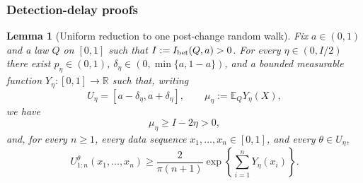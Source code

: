 \documentclass[12pt]{article}
\theoremstyle{spaced}
\newtheorem{lemma}[lemma]{Lemma}
\theoremstyle{remark}
\newcommand{\E}{\mathbb E}
\begin{document}
\subsubsection{Detection-delay proofs}
\label{app:bounded-UP-delay}


\begin{lemma}[Uniform reduction to one post-change random walk]
\label{lem:UP-one-good-bet-uniform}
Fix $a\in(0,1)$ and a law $Q$ on $[0,1]$ such that
$I:=I_{\rm bet}(Q,a)>0$.  For every $\eta\in(0,I/2)$ there exist
$p_\eta\in(0,1)$, $\delta_\eta\in(0,\min\{a,1-a\})$, and a bounded
measurable function $Y_\eta:[0,1]\to\mathbb R$ such that, writing
\[
 U_\eta=[a-\delta_\eta,a+\delta_\eta],
 \qquad
 \mu_\eta:=\E_QY_\eta(X),
\]
we have
\begin{equation}
\label{eq:UP-one-good-bet-drift}
 \mu_\eta\ge I-2\eta>0,
\end{equation}
and, for every $n\ge1$, every data sequence $x_1,\ldots,x_n\in[0,1]$,
and every $\theta\in U_\eta$,
\begin{equation}
\label{eq:UP-one-good-bet-pathwise}
 U_{1:n}^{\theta}(x_1,\ldots,x_n)
 \ge \frac{2}{\pi(n+1)}
       \exp\left\{\sum_{i=1}^nY_\eta(x_i)\right\}.
\end{equation}
\end{lemma}
\end{document}
